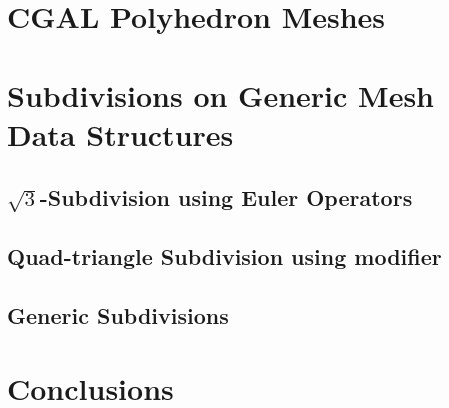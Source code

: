 \documentclass{egpubl}
\begin{document}
\section{CGAL Polyhedron Meshes}
 

\section{Subdivisions on Generic Mesh Data Structures}


\subsection{$\sqrt{3}$-Subdivision using Euler Operators}

\subsection{Quad-triangle Subdivision using modifier}


\subsection{Generic Subdivisions}


%

\section{Conclusions}




\end{document}
